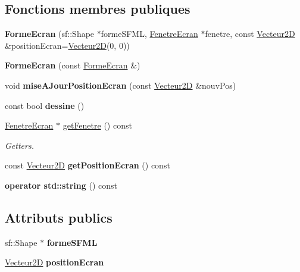 \subsection*{Fonctions membres publiques}
\begin{DoxyCompactItemize}
\item 
\mbox{\label{class_forme_ecran_a719711c110f071c2924fd2a3dc3ae040}} 
{\bfseries Forme\+Ecran} (sf\+::\+Shape $\ast$forme\+S\+F\+ML, \mbox{\hyperlink{class_fenetre_ecran}{Fenetre\+Ecran}} $\ast$fenetre, const \mbox{\hyperlink{class_vecteur2_d}{Vecteur2D}} \&position\+Ecran=\mbox{\hyperlink{class_vecteur2_d}{Vecteur2D}}(0, 0))
\item 
\mbox{\label{class_forme_ecran_a389a4eef0f47f3451440113055453052}} 
{\bfseries Forme\+Ecran} (const \mbox{\hyperlink{class_forme_ecran}{Forme\+Ecran}} \&)
\item 
\mbox{\label{class_forme_ecran_af7218febcf2ff9b7881fff962a81d5e9}} 
void {\bfseries mise\+A\+Jour\+Position\+Ecran} (const \mbox{\hyperlink{class_vecteur2_d}{Vecteur2D}} \&nouv\+Pos)
\item 
\mbox{\label{class_forme_ecran_abd24ffecc0acb7f75635dd5a9b96cc63}} 
const bool {\bfseries dessine} ()
\item 
\mbox{\label{class_forme_ecran_a781177121ce901c848958800e0ce12ec}} 
\mbox{\hyperlink{class_fenetre_ecran}{Fenetre\+Ecran}} $\ast$ \mbox{\hyperlink{class_forme_ecran_a781177121ce901c848958800e0ce12ec}{get\+Fenetre}} () const
\begin{DoxyCompactList}\small\item\em Getters. \end{DoxyCompactList}\item 
\mbox{\label{class_forme_ecran_a6bf6d1c849fed205f2fc7f1a822ee383}} 
const \mbox{\hyperlink{class_vecteur2_d}{Vecteur2D}} {\bfseries get\+Position\+Ecran} () const
\item 
\mbox{\label{class_forme_ecran_a0dc759bf4cdbe9a2e679566263284128}} 
{\bfseries operator std\+::string} () const
\end{DoxyCompactItemize}
\subsection*{Attributs publics}
\begin{DoxyCompactItemize}
\item 
\mbox{\label{class_forme_ecran_ae4802e73968518593b6249ed52c7f42f}} 
sf\+::\+Shape $\ast$ {\bfseries forme\+S\+F\+ML}
\item 
\mbox{\label{class_forme_ecran_a0f01418938b55cdea36396e2d215b4cf}} 
\mbox{\hyperlink{class_vecteur2_d}{Vecteur2D}} {\bfseries position\+Ecran}
\end{DoxyCompactItemize}
